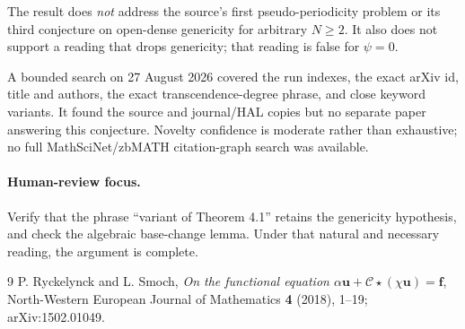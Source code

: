 \documentclass[11pt]{article}
\begin{document}
The result does \emph{not} address the source's first pseudo-periodicity
problem or its third conjecture on open-dense genericity for arbitrary
\(N\geq2\). It also does not support a reading that drops genericity; that
reading is false for \(\psi=0\).

A bounded search on 27 August 2026 covered the run indexes, the exact arXiv id,
title and authors, the exact transcendence-degree phrase, and close keyword
variants. It found the source and journal/HAL copies but no separate paper
answering this conjecture. Novelty confidence is moderate rather than
exhaustive; no full MathSciNet/zbMATH citation-graph search was available.

\paragraph{Human-review focus.}
Verify that the phrase ``variant of Theorem 4.1'' retains the genericity
hypothesis, and check the algebraic base-change lemma. Under that natural and
necessary reading, the argument is complete.

\begin{thebibliography}{9}
P. Ryckelynck and L. Smoch,
\emph{On the functional equation \(\alpha\mathbf{u}+\mathcal{C}\star
(\chi\mathbf{u})=\mathbf{f}\)},
North-Western European Journal of Mathematics \textbf{4} (2018), 1--19;
arXiv:1502.01049.
\end{thebibliography}
\end{document}
